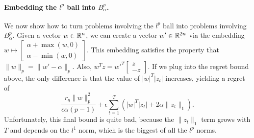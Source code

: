 \documentclass[11pt]{article}
\begin{document}
\paragraph{Embedding the $l^p$ ball into $B_{\alpha}^p$.} We now show how to turn problems 
involving the $l^p$ ball into problems involving $B_{\alpha}^p$. Given a vector 
$w \in \mathbb{R}^n$, we can create a vector $w' \in \mathbb{R}^{2n}$ via the embedding 
$w \mapsto \left[ \begin{array}{c} \alpha + \max(w, 0) \\ \alpha - \min(w,0) \end{array} \right]$. 
This embedding satisfies the property that $\|w\|_p = \|w'-\alpha\|_p$. Also, $w^Tz = w'^T\left[ \begin{array}{c} z \\ -z \end{array} \right]$. 
If we plug into the regret bound above, the only difference is that the value of $|w|^T|z_t|$ increases, yielding 
a regret of
\[ \frac{r_q \|w\|_p^2}{\epsilon \alpha (p-1)} + \epsilon \sum_{t=1}^T \left(|w|^T|z_t| + 2\alpha \|z_t\|_1\right). \]
Unfortunately, this final bound is quite bad, because the $\|z_t\|_1$ term grows with $T$ and depends on the 
$l^1$ norm, which is the biggest of all the $l^p$ norms.
\end{document}
